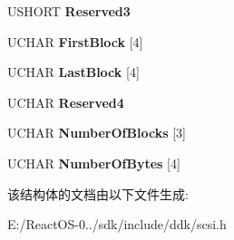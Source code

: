\begin{DoxyCompactItemize}
U\+S\+H\+O\+RT {\bfseries Reserved3}
\item 
\mbox{\label{struct___t_a_p_e___p_o_s_i_t_i_o_n___d_a_t_a_add13025b5bc21d7e8d89a2c2a3a1e675}} 
U\+C\+H\+AR {\bfseries First\+Block} \mbox{[}4\mbox{]}
\item 
\mbox{\label{struct___t_a_p_e___p_o_s_i_t_i_o_n___d_a_t_a_a5ea9e6b49cc520ed6aa9113cdfebe588}} 
U\+C\+H\+AR {\bfseries Last\+Block} \mbox{[}4\mbox{]}
\item 
\mbox{\label{struct___t_a_p_e___p_o_s_i_t_i_o_n___d_a_t_a_ada98186b020f120ddf927fb1660cabf5}} 
U\+C\+H\+AR {\bfseries Reserved4}
\item 
\mbox{\label{struct___t_a_p_e___p_o_s_i_t_i_o_n___d_a_t_a_a838cfdde53a2f7abc584bcf6a5f24a28}} 
U\+C\+H\+AR {\bfseries Number\+Of\+Blocks} \mbox{[}3\mbox{]}
\item 
\mbox{\label{struct___t_a_p_e___p_o_s_i_t_i_o_n___d_a_t_a_a18b06196a49a1739dcc4286d074c83ca}} 
U\+C\+H\+AR {\bfseries Number\+Of\+Bytes} \mbox{[}4\mbox{]}
\end{DoxyCompactItemize}


该结构体的文档由以下文件生成\+:\begin{DoxyCompactItemize}
\item 
E\+:/\+React\+O\+S-\/0../sdk/include/ddk/scsi.\+h\end{DoxyCompactItemize}
